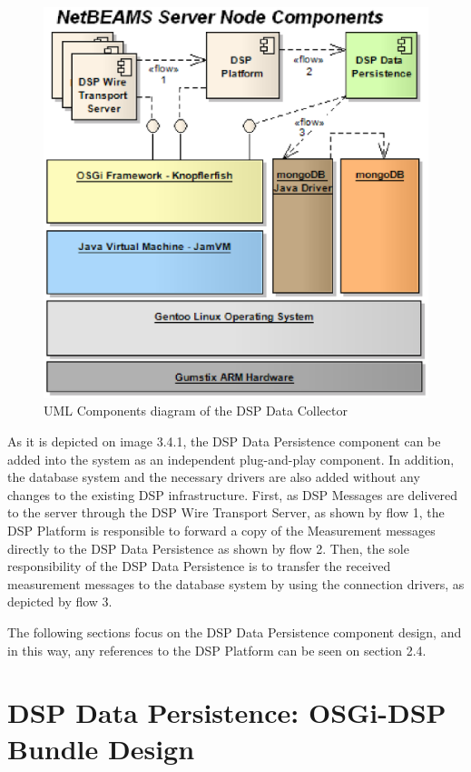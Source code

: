 \begin{figure}[!b]
  \centering
  \includegraphics[scale=0.5]{../diagrams/NetBEAMS-Persistence-Server-Node-Components}
  \caption{UML Components diagram of the DSP Data Collector}
  \label{fig:NetBEAMS-Persistence-Server-Node-Components}
\end{figure}

As it is depicted on image 3.4.1, the DSP Data Persistence component can be
added into the system as an independent plug-and-play component. In addition,
the database system and the necessary drivers are also added without any
changes to the existing DSP infrastructure. First, as DSP Messages are
delivered to the server through the DSP Wire Transport Server, as shown by flow
1, the DSP Platform is responsible to forward a copy of the Measurement
messages directly to the DSP Data Persistence as shown by flow 2. Then, the
sole responsibility of the DSP Data Persistence is to transfer the received
measurement messages to the database system by using the connection drivers, as
depicted by flow 3.

The following sections focus on the DSP Data Persistence component design, and
in this way, any references to the DSP Platform can be seen on section 2.4.

\section{DSP Data Persistence: OSGi-DSP Bundle Design}


